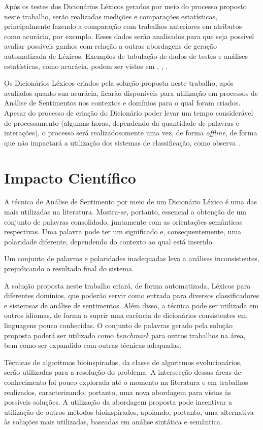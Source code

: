 \documentclass[a4paper,11pt]{article}
\begin{document}
Após os testes dos Dicionários Léxicos gerados por meio do processo proposto neste trabalho, serão realizadas medições e comparações estatísticas, principalmente fazendo a comparação com trabalhos anteriores em atributos como acurácia, por exemplo. Esses dados serão analisados para que seja possível avaliar possíveis ganhos com relação a outras abordagens de geração automatizada de Léxicos. Exemplos de tabulação de dados de testes e análises estatísticas, como acurácia, podem ser vistos em \cite{taboada2011lexicon}, \cite{Kanayama2006}, \cite{HADDI2013}.

Os Dicionários Léxicos criados pela solução proposta neste trabalho, após avaliados quanto sua acurácia, ficarão disponíveis para utilização em processos de Análise de Sentimentos nos contextos e domínios para o qual foram criados. Apesar do processo de criação do Dicionário poder levar um tempo considerável de processamento (algumas horas, dependendo da quantidade de palavras e interações), o processo será realizadosomente uma vez, de forma \emph{offline}, de forma que não impactará a utilização dos sistemas de classificação, como observa \cite{Abbasi}.

\section{Impacto Científico}
\label{sec:impact}
A técnica de Análise de Sentimento por meio de um Dicionário Léxico é uma das mais utilizadas na literatura. Mostra-se, portanto, essencial a obtenção de um conjunto de palavras consolidado, juntamente com as orientações semânticas respectivas. 
Uma palavra pode ter um significado e, consequentemente, uma polaridade diferente, dependendo do contexto ao qual está inserido. 

Um conjunto de palavras e polaridades inadequadas leva a análises inconsistentes, prejudicando o resultado final do sistema.

A solução proposta neste trabalho criará, de forma automatizada, Léxicos para diferentes domínios, que poderão servir como entrada para diversos classificadores e sistemsas de análise de sentimentos. Além disso, a técnica pode ser utilizada em outros idiomas, de forma a suprir uma carência de dicionários consistentes em linguagens pouco conhecidas.
O conjunto de palavras gerado pela solução proposta poderá ser utilizado como \emph{benchmark} para outros trabalhos na área, bem como ser expandido com outras técnicas adequadas.

Técnicas de algoritmos bioinspirados, da classe de algoritmos evolucionários, serão utilizadas para a resolução do problema. A intersecção dessas áreas de conhecimento foi pouco explorada até o momento na literatura e em trabalhos realizados, caracterizando, portanto, uma nova abordagem para vistas às possíveis soluções. A utilização da abordagem proposta pode incentivar a utilização de outros métodos bioinspirados, apoiando, portanto, uma alternativa às soluções mais utilizadas, baseadas em análise sintática e semântica.
\end{document}
